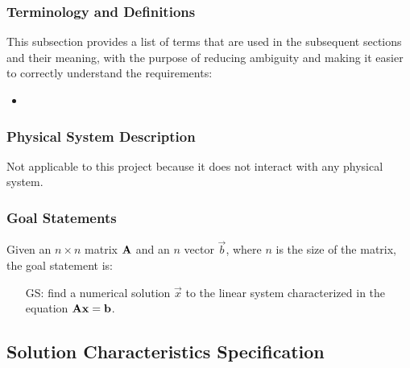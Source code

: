 \documentclass[12pt]{article}
\newcounter{goalnum} %
\begin{document}
\subsubsection{Terminology and  Definitions}


This subsection provides a list of terms that are used in the subsequent
sections and their meaning, with the purpose of reducing ambiguity and making it
easier to correctly understand the requirements:

\begin{itemize}

\item

\end{itemize}

\subsubsection{Physical System Description} \label{sec_phySystDescrip}

Not applicable to this project because it does not interact with any physical
system.

\subsubsection{Goal Statements}

\noindent Given an \(n \times n\) matrix \(\mathbf{A}\) and an \(n\) vector \(\vec{b}\),
where \(n\) is the size of the matrix, the goal statement is:

\begin{itemize}
\item[GS\refstepcounter{goalnum}\thegoalnum \label{GS:Axb}:] find a numerical
  solution \(\vec{x}\) to the linear system characterized in the equation
  \(\mathbf{A}\mathbf{x} = \mathbf{b}\).
\end{itemize}

\subsection{Solution Characteristics Specification}
\end{document}
